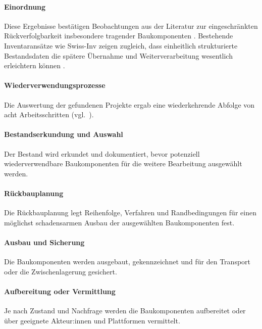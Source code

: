 \documentclass[type=zwischenbericht]{zukunftbau}
\begin{document}
\begin{SemioNest}
\begin{SemioNest}
\paragraph{Einordnung}
Diese Ergebnisse bestätigen Beobachtungen aus der Literatur zur eingeschränkten Rückverfolgbarkeit insbesondere tragender Baukomponenten \cite{densley-tingley-cooper-cullen-structural-steel-reuse-2017,sivers-fivet-reuse-market-dynamics-2025}. Bestehende Inventaransätze wie Swiss-Inv zeigen zugleich, dass einheitlich strukturierte Bestandsdaten die spätere Übernahme und Weiterverarbeitung wesentlich erleichtern können \cite{cirkla-swiss-inv}.
\end{SemioNest}
  
\paragraph{Wiederverwendungsprozesse}
Die Auswertung der gefundenen Projekte ergab eine wiederkehrende Abfolge von acht Arbeitsschritten (vgl.\ ).
  

\begin{SemioNest}
\paragraph{Bestandserkundung und Auswahl}
Der Bestand wird erkundet und dokumentiert, bevor potenziell wiederverwendbare Baukomponenten für die weitere Bearbeitung ausgewählt werden.

\paragraph{Rückbauplanung}
Die Rückbauplanung legt Reihenfolge, Verfahren und Randbedingungen für einen möglichst schadensarmen Ausbau der ausgewählten Baukomponenten fest.

\paragraph{Ausbau und Sicherung}
Die Baukomponenten werden ausgebaut, gekennzeichnet und für den Transport oder die Zwischenlagerung gesichert.

\paragraph{Aufbereitung oder Vermittlung}
Je nach Zustand und Nachfrage werden die Baukomponenten aufbereitet oder über geeignete Akteur:innen und Plattformen vermittelt.


\end{SemioNest}
\end{SemioNest}
\end{document}
